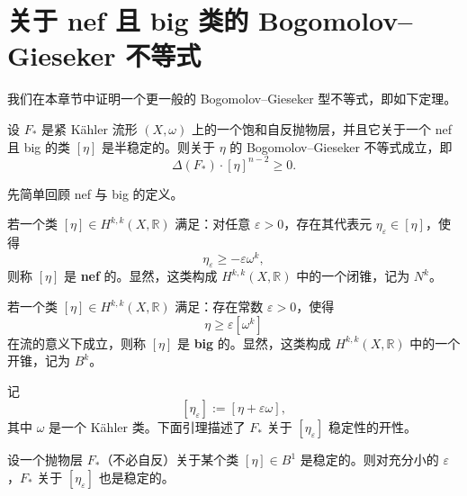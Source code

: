 \chapter{关于 nef 且 big 类的 Bogomolov--Gieseker 不等式}

我们在本章节中证明一个更一般的 Bogomolov--Gieseker 型不等式，即如下定理。

\begin{theorem}
设 \(F_*\) 是紧 Kähler 流形 \((X,\omega)\) 上的一个饱和自反抛物层，并且它关于一个 nef 且 big 的类 \([\eta]\) 是半稳定的。则关于 \(\eta\) 的 Bogomolov--Gieseker 不等式成立，即
\[
\Delta(F_*)\cdot [\eta]^{n-2}\ge 0.
\]
\end{theorem}

先简单回顾 nef 与 big 的定义。

\begin{definition}
若一个类 \([\eta]\in H^{k,k}(X,\mathbb R)\) 满足：对任意 \(\varepsilon>0\)，存在其代表元 \(\eta_\varepsilon\in [\eta]\)，使得
\[
\eta_\varepsilon\ge -\varepsilon \omega^k,
\]
则称 \([\eta]\) 是 \textbf{nef} 的。显然，这类构成 \(H^{k,k}(X,\mathbb R)\) 中的一个闭锥，记为 \(N^k\)。
\end{definition}

\begin{definition}
若一个类 \([\eta]\in H^{k,k}(X,\mathbb R)\) 满足：存在常数 \(\varepsilon>0\)，使得
\[
\eta\ge \varepsilon[\omega^k]
\]
在流的意义下成立，则称 \([\eta]\) 是 \textbf{big} 的。显然，这类构成 \(H^{k,k}(X,\mathbb R)\) 中的一个开锥，记为 \(B^k\)。
\end{definition}

记
\[
[\eta_\varepsilon]:=[\eta+\varepsilon\omega],
\]
其中 \(\omega\) 是一个 Kähler 类。下面引理描述了 \(F_*\) 关于 \([\eta_\varepsilon]\) 稳定性的开性。

\begin{lemma}
设一个抛物层 \(F_*\)（不必自反）关于某个类 \([\eta]\in B^1\) 是稳定的。则对充分小的 \(\varepsilon\)，\(F_*\) 关于 \([\eta_\varepsilon]\) 也是稳定的。
\end{lemma}


